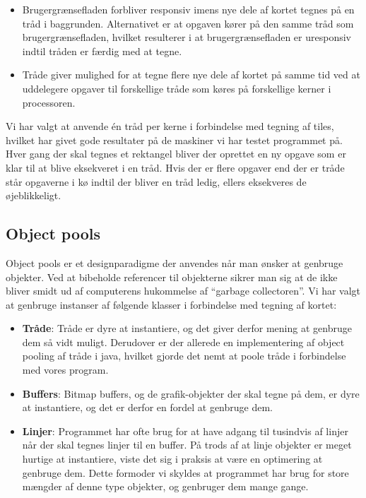 \begin{itemize}
	\item Brugergrænsefladen forbliver responsiv imens nye dele af kortet tegnes på en tråd i baggrunden. Alternativet er at opgaven kører på den samme tråd som brugergrænsefladen, hvilket resulterer i at brugergrænsefladen er uresponsiv indtil tråden er færdig med at tegne.
	\item Tråde giver mulighed for at tegne flere nye dele af kortet på samme tid ved at uddelegere opgaver til forskellige tråde som køres på forskellige kerner i processoren.
\end{itemize}

Vi har valgt at anvende én tråd per kerne i forbindelse med tegning af tiles, hvilket har givet gode resultater på de maskiner vi har testet programmet på. Hver gang der skal tegnes et rektangel bliver der oprettet en ny opgave som er klar til at blive eksekveret i en tråd. Hvis der er flere opgaver end der er tråde står opgaverne i kø indtil der bliver en tråd ledig, ellers eksekveres de øjeblikkeligt.

\subsection{Object pools}
\label{subsec:objectPools}

Object pools er et designparadigme der anvendes når man ønsker at genbruge objekter. Ved at bibeholde referencer til objekterne sikrer man sig at de ikke bliver smidt ud af computerens hukommelse af ``garbage collectoren''. Vi har valgt at genbruge instanser af følgende klasser i forbindelse med tegning af kortet:

\begin{itemize}
	\item \textbf{Tråde}: Tråde er dyre at instantiere, og det giver derfor mening at genbruge dem så vidt muligt. Derudover er der allerede en implementering af object pooling af tråde i java, hvilket gjorde det nemt at poole tråde i forbindelse med vores program.
	\item \textbf{Buffers}: Bitmap buffers, og de grafik-objekter der skal tegne på dem, er dyre at instantiere, og det er derfor en fordel at genbruge dem.
	\item \textbf{Linjer}: Programmet har ofte brug for at have adgang til tusindvis af linjer når der skal tegnes linjer til en buffer. På trods af at linje objekter er meget hurtige at instantiere, viste det sig i praksis at være en optimering at genbruge dem. Dette formoder vi skyldes at programmet har brug for store mængder af denne type objekter, og genbruger dem mange gange.
\end{itemize}

